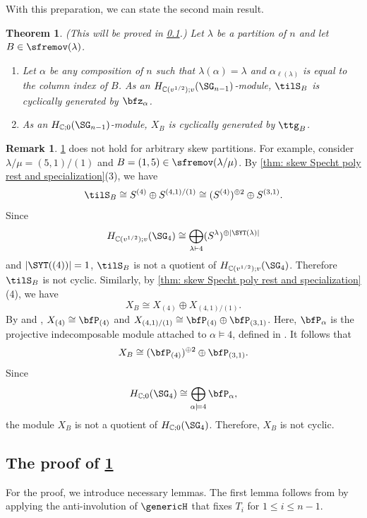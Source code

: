 \documentclass[12pt, reqno]{amsart}
\theoremstyle{plain}
\newtheorem{theorem}{Theorem}[section]
\theoremstyle{definition}
\newtheorem{remark}[remark]{Remark}
\numberwithin{equation}{section}
\numberwithin{figure}{section}
\numberwithin{table}{section}
\def\C{\mathbb C}
\begin{document}
With this preparation, we can state the second main result.

 
\begin{theorem}\label{thm: generator of S and X as n-1}{\rm (This will be proved in \cref{subsec: proof of main theorem}.)}
Let $\lambda$ be a partition of $n$ and let $B \in \sfremov(\lambda)$. 
\begin{enumerate}[label = {\rm (\arabic*)}]
\item 
Let $\alpha$ be any composition of $n$ such that $\lambda(\alpha) = \lambda$ and $\alpha_{\ell(\lambda)}$ is equal to the column index of $B$. 
As an $H_{\C(v^{1/2});v}(\SG_{n-1})$-module, $\tilS_{B}$ is cyclically generated by $\bfz_\alpha$.
\item
As an $H_{\C;0}(\SG_{n-1})$-module, $X_{B}$  is cyclically generated by $\ttg_{B}$.
\end{enumerate}
\end{theorem}


\begin{remark}\label{rem: removable component is not cyclic}
\cref{thm: generator of S and X as n-1} does not hold for arbitrary skew partitions.
For example, consider $\lambda/\mu=(5,1)/(1)$ and $B = (1,5) \in \sfremov(\lambda/\mu)$.
By \cref{thm: skew Specht poly rest and specialization}(3), we have 
\[
\tilS_B 
\cong
S^{(4)} \oplus
S^{(4,1)/(1)} 
\cong
(S^{(4)})^{\oplus 2}\oplus S^{(3,1)}.
\]
Since 
\[
H_{\C(v^{1/2});v}(\SG_4) \cong \bigoplus_{\lambda \vdash 4} (S^{\lambda})^{\oplus |\SYT(\lambda)|}
\]  
and $|\SYT((4))| = 1$, 
$\tilS_B$ is not a quotient of $H_{\C(v^{1/2});v}(\SG_4)$.
Therefore $\tilS_B$ is not cyclic.
Similarly, 
by \cref{thm: skew Specht poly rest and specialization}(4), we have 
\[
X_B \cong X_{(4)} \oplus X_{(4,1)/(1)}.
\]
By \cite[Remark A.1(2)]{23KLO} and \cite[Theorem 3.3]{16Huang}, $X_{(4)} \cong \bfP_{(4)}$ and $X_{(4,1)/(1)} \cong \bfP_{(4)} \oplus \bfP_{(3,1)}$.
Here, $\bfP_{\alpha}$ is the projective indecomposable module attached to $\alpha \models 4$, defined in \cite{16Huang}.
It follows that
\[
X_B \cong  (\bfP_{(4)})^{\oplus 2} \oplus \bfP_{(3,1)}.
\]
Since
\[
H_{\C;0}(\SG_4) \cong  \bigoplus_{\alpha \models 4} \bfP_{\alpha},
\]
the module $X_B$ is not a quotient  of $H_{\C;0}(\SG_4)$.
Therefore, $X_B$ is not cyclic.
\end{remark}




\subsection{The proof of \cref{thm: generator of S and X as n-1}}
\label{subsec: proof of main theorem}
For the proof, we introduce necessary lemmas. 
The first lemma follows from \cite[Lemma~4.1]{86DJ} by applying the anti-involution of $\genericH$ that fixes $T_i$ for $1 \leq i \leq n-1$.
\end{document}
